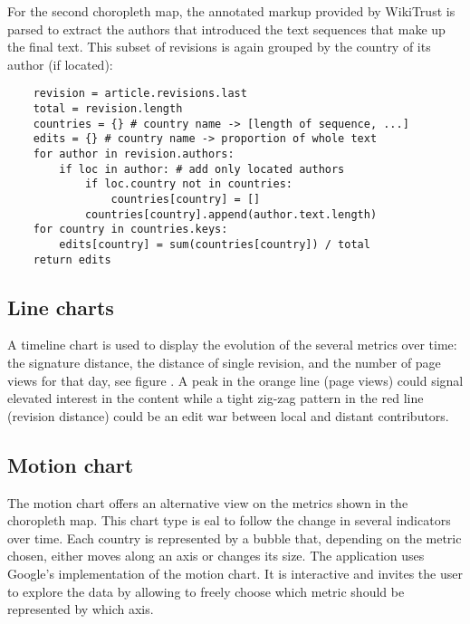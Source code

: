 
For the second choropleth map, the annotated markup provided by WikiTrust is parsed to extract the authors that introduced the text sequences that make up the final text.
This subset of revisions is again grouped by the country of its author (if located):

\begin{lstlisting}
	revision = article.revisions.last
	total = revision.length
	countries = {} # country name -> [length of sequence, ...]
	edits = {} # country name -> proportion of whole text
	for author in revision.authors:
		if loc in author: # add only located authors
			if loc.country not in countries:
				countries[country] = []
			countries[country].append(author.text.length)
	for country in countries.keys:
		edits[country] = sum(countries[country]) / total
	return edits
\end{lstlisting}

\subsection{Line charts}

A timeline chart is used to display the evolution of the several metrics over time: the signature distance, the distance of single revision, and the number of page views for that day, see figure .
A peak in the orange line (page views) could signal elevated interest in the content while a tight zig-zag pattern in the red line (revision distance) could be an edit war between local and distant contributors.


\subsection{Motion chart}

The motion chart offers an alternative view on the metrics shown in the choropleth map.
This chart type is eal to follow the change in several indicators over time.
Each country is represented by a bubble that, depending on the metric chosen, either moves along an axis or changes its size.
The application uses Google's implementation of the motion chart.
It is interactive and invites the user to explore the data by allowing to freely choose which metric should be represented by which axis.

